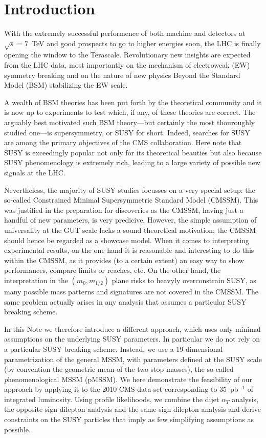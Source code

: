 \section{Introduction}
\label{sec:intro}

With the extremely successful performence of both machine and detectors
at $\sqrt{s}=7$~TeV and good prospects to go to higher energies soon, 
the LHC is finally opening the window to the Terascale. 
Revolutionary new insights are expected from the LHC data, most importantly 
on the mechanism of electroweak (EW) symmetry breaking and on the nature 
of new physics Beyond the Standard Model (BSM) stabilizing the EW scale. 

A wealth of BSM theories has been put forth by the theoretical community 
and it is now up to experiments to test which, if any, of these theories 
are correct. 
The arguably best motivated such BSM theory---but certainly the most 
thouroughly studied one---is supersymmetry, or SUSY for short. 
Indeed, searches for SUSY are among the primary objectives of the 
CMS collaboration. Here note that SUSY is exceedingly popular not 
only for its theoretical beauties but also because SUSY phenomenology 
is extremely rich, 
leading to a large variety of possible new signals at the LHC. 

Nevertheless, the majority of SUSY studies focusses on a very special 
setup: the so-called Constrained Minimal Supersymmetric Standard Model (CMSSM). 
This was justified in the preparation for discoveries as the CMSSM, 
having just a handful of new parameters, is very predicive. However, 
the simple assumption of universality at the GUT scale lacks a sound 
theoretical motivation; the CMSSM should hence be regarded as a showcase 
model. When it comes to interpreting experimental results, on the 
one hand it is reasonable and interesting to do this within the CMSSM, 
as it provides (to a certain extent) an easy way to show performances, 
compare limits or reaches, etc. On the other hand, the interpretation in the 
$(m_0,m_{1/2})$ plane risks to heavyly overconstrain SUSY, as many 
possible mass patterns and signatures are not covered in the CMSSM. 
The same problem actually arises in any analysis that assumes a particular 
SUSY breaking scheme. 

In this Note we therefore introduce a different approach, which uses only 
minimal assumptions on the underlying SUSY parameters. In particular we do 
not rely on a particular SUSY breaking scheme. Instead, we use a 19-dimensional 
parametrization of the general MSSM, with parameters defined at the SUSY scale 
(by convention the geometric mean of the two stop masses), 
the so-called {\emph phenomenological MSSM} (pMSSM). 
We here demonstrate the feasibility of our approach by applying it to 
the 2010 CMS data-set corresponding to 35~pb$^{-1}$ of integrated luminosity.  
Using profile likelihoods, we combine 
the dijet $\alpha_T$ analysis, the opposite-sign dilepton 
analysis and the same-sign dilepton analysis and derive constraints 
on the SUSY particles that imply as few simplifying assumptions as possible.

